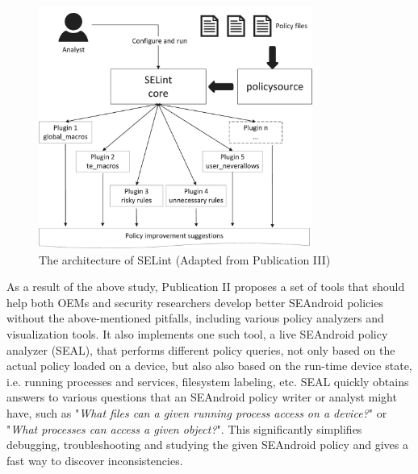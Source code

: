 \begin{figure}[t]
	\centering
		\includegraphics[width=0.80\textwidth]{figures/selint.png}
	\caption{The architecture of SELint (Adapted from Publication III)}
	\label{fig:selint}
\end{figure}

As a result of the above study, Publication II proposes a set of tools that should help both OEMs and security researchers develop better SEAndroid policies without the above-mentioned pitfalls, including various policy analyzers and visualization tools. It also implements one such tool, a live SEAndroid policy analyzer (SEAL), that performs different policy queries, not only based on the actual policy loaded on a device, but also also based on the run-time device state, i.e. running processes and services, filesystem labeling, etc. SEAL quickly obtains answers to various questions that an SEAndroid policy writer or analyst might have, such as "\textit{What files can a given running process access on a device?}" or "\textit{What processes can access a given object?}". This significantly simplifies debugging, troubleshooting and studying the given SEAndroid policy and gives a fast way to discover inconsistencies. 

